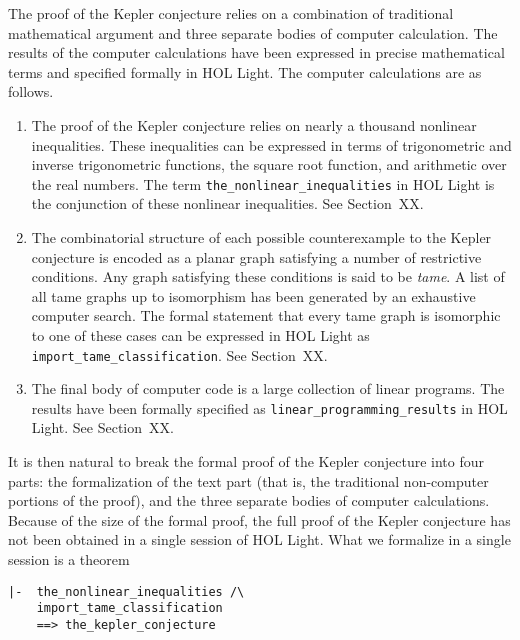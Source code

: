 The proof of the Kepler conjecture relies on a combination of
traditional mathematical argument and three separate bodies of
computer calculation.  The results of the computer calculations have
been expressed in precise mathematical terms and specified formally in
HOL Light.  The computer calculations are as follows.
\begin{enumerate}
\item The proof of the Kepler conjecture relies on nearly a thousand
  nonlinear inequalities.  These inequalities can be expressed in
  terms of trigonometric and inverse trigonometric functions, the
  square root function, and arithmetic over the real numbers.  The
  term \verb!the_nonlinear_inequalities! in HOL Light is the
  conjunction of these nonlinear inequalities.  See Section~XX.
\item The combinatorial structure of each possible counterexample to
  the Kepler conjecture is encoded as a planar graph satisfying a
  number of restrictive conditions.  Any graph satisfying these
  conditions is said to be {\it tame}.  A list of all tame graphs up
  to isomorphism has been generated by an exhaustive computer search.
  The formal statement that every tame graph is isomorphic to one of
  these cases can be expressed in HOL Light as
  \verb!import_tame_classification!.  See Section~XX.
\item The final body of computer code is a large collection of linear
  programs.  The results have been formally specified as
  \verb!linear_programming_results! in HOL Light.  See Section~XX.
\end{enumerate}

It is then natural to break the formal proof of the Kepler conjecture
into four parts: the formalization of the text part (that is, the
traditional non-computer portions of the proof), and the three
separate bodies of computer calculations.  Because of the size of the
formal proof, the full proof of the Kepler conjecture has not been
obtained in a single session of HOL Light.  What we formalize in a
single session is a theorem

\begin{obeylines}

\begin{verbatim}
|-  the_nonlinear_inequalities /\
    import_tame_classification
    ==> the_kepler_conjecture
\end{verbatim}

\end{obeylines}


